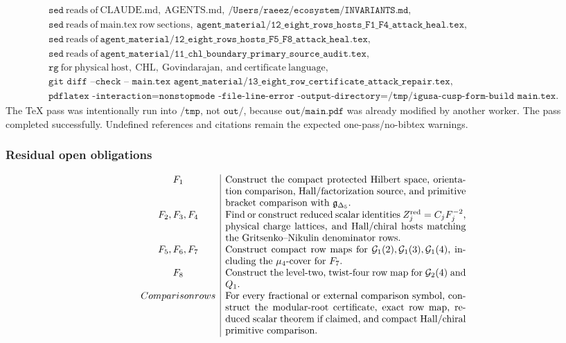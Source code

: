 \[
\begin{array}{l}
\texttt{sed}\ \mathrm{reads\ of\ CLAUDE.md,\ AGENTS.md,\ }
\texttt{/Users/raeez/ecosystem/INVARIANTS.md},\\
\texttt{sed}\ \mathrm{reads\ of\ main.tex\ row\ sections,\ }
\texttt{agent\_material/12\_eight\_rows\_hosts\_F1\_F4\_attack\_heal.tex},\\
\texttt{sed}\ \mathrm{reads\ of\ }
\texttt{agent\_material/12\_eight\_rows\_hosts\_F5\_F8\_attack\_heal.tex},\\
\texttt{sed}\ \mathrm{reads\ of\ }
\texttt{agent\_material/11\_chl\_boundary\_primary\_source\_audit.tex},\\
\texttt{rg}\ \mathrm{for\ physical\ host,\ CHL,\ Govindarajan,\ }
\mathrm{and\ certificate\ language},\\
\texttt{git\ diff\ --check\ --\ main.tex\ }
\texttt{agent\_material/13\_eight\_row\_certificate\_attack\_repair.tex},\\
\texttt{pdflatex\ -interaction=nonstopmode\ -file-line-error\ }
\texttt{-output-directory=/tmp/igusa-cusp-form-build\ main.tex}.
\end{array}
\]
The TeX pass was intentionally run into \(\texttt{/tmp}\), not
\(\texttt{out/}\), because \(\texttt{out/main.pdf}\) was already modified
by another worker.  The pass completed successfully.  Undefined
references and citations remain the expected one-pass/no-bibtex warnings.

\subsubsection*{Residual open obligations}

\[
\begin{array}{c|p{0.72\textwidth}}
F_1&
Construct the compact protected Hilbert space, orientation comparison,
Hall/factorization source, and primitive bracket comparison with
\(\mathfrak g_{\Delta_5}\).\\
F_2,F_3,F_4&
Find or construct reduced scalar identities
\(Z_j^{\mathrm{red}}=C_jF_j^{-2}\), physical charge lattices, and
Hall/chiral hosts matching the Gritsenko--Nikulin denominator rows.\\
F_5,F_6,F_7&
Construct compact row maps for
\(\mathcal G_1(2),\mathcal G_1(3),\mathcal G_1(4)\), including the
\(\mu_4\)-cover for \(F_7\).\\
F_8&
Construct the level-two, twist-four row map for
\(\mathcal G_2(4)\) and \(Q_1\).\\
Comparison rows&
For every fractional or external comparison symbol, construct the
modular-root certificate, exact row map, reduced scalar theorem if
claimed, and compact Hall/chiral primitive comparison.
\end{array}
\]
